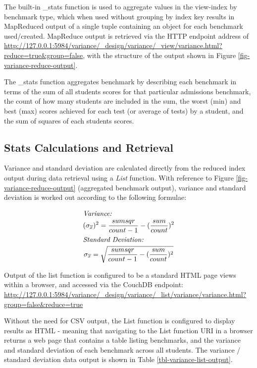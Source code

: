The built-in \_stats function is used to aggregate values in the view-index by benchmark type, which when used without grouping by index key results in MapReduced output of a single tuple containing an object for each benchmark used/created. MapReduce output is retrieved via the HTTP endpoint address of \url{http://127.0.0.1:5984/variance/_design/variance/_view/variance.html?reduce=true&group=false}, with the structure of the output shown in Figure \ref{fig-variance-reduce-output}.



The \_stats function aggregates benchmark by describing each benchmark in terms of the sum of all students scores for that particular admissions benchmark, the count of how many students are included in the sum, the worst (min) and best (max) scores achieved for each test (or average of tests) by a student, and the sum of squares of each students scores.

\subsection{Stats Calculations and Retrieval}
Variance and standard deviation are calculated directly from the reduced index output during data retrieval using a \textit{List} function. With reference to Figure \ref{fig-variance-reduce-output} (aggregated benchmark output), variance and standard deviation is worked out according to the following formulae:

\begin{spreadlines}{15pt}
    \begin{gather*}
        \intertext{\textit{Variance:}}
        (\sigma_{\overline{x}})^{2} = \frac{sumsqr}{count-1} - (\frac{sum}{count})^{2}\\
        \intertext{\textit{Standard Deviation:}}
        \sigma_{\overline{x}} = \sqrt{\frac{sumsqr}{count-1} - (\frac{sum}{count})^{2}}
    \end{gather*}
\end{spreadlines}

Output of the list function is configured to be a standard HTML page views within a browser, and accessed via the CouchDB endpoint: \url{http://127.0.0.1:5984/variance/_design/variance/_list/variance/variance.html?group=false&reduce=true}

Without the need for CSV output, the List function is configured to display results as HTML - meaning that navigating to the List function URI in a browser returns a web page that contains a table listing benchmarks, and the variance and standard deviation of each benchmark across all students. The variance / standard deviation data output is shown in Table \ref{tbl-variance-list-output}.

